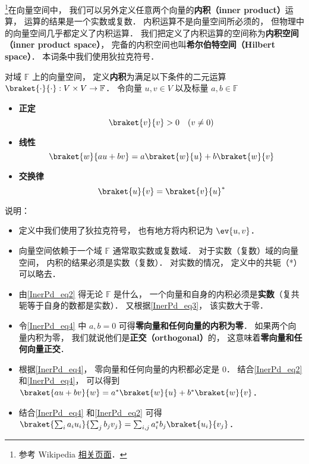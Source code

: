 

\footnote{参考 Wikipedia \href{https://en.wikipedia.org/wiki/Inner_product_space}{相关页面}．}在向量空间中， 我们可以另外定义任意两个向量的\textbf{内积（inner product）}运算， 运算的结果是一个实数或复数． 内积运算不是向量空间所必须的， 但物理中的向量空间几乎都定义了内积运算． 我们把定义了内积运算的空间称为\textbf{内积空间（inner product space）}， 完备的内积空间也叫\textbf{希尔伯特空间（Hilbert space）}． 本词条中我们使用狄拉克符号．

\begin{definition}{}
对域 $\mathbb F$ 上的向量空间， 定义\textbf{内积}为满足以下条件的二元运算 $\braket{\cdot}{\cdot}: V\times V\to \mathbb F$． 令向量 $u, v\in V$ 以及标量 $a, b \in \mathbb F$
\begin{itemize}
\item \textbf{正定}
\begin{equation}\label{InerPd_eq3}
\braket{v}{v} > 0 \quad (v \ne 0)
\end{equation}
\item \textbf{线性}
\begin{equation}\label{InerPd_eq4}
\braket{w}{a u + b v} = a\braket{w}{u} + b\braket{w}{v}
\end{equation}
\item \textbf{交换律}
\begin{equation}\label{InerPd_eq2}
\braket{u}{v} = \braket{v}{u}^*
\end{equation}
\end{itemize}
\end{definition}
说明：
\begin{itemize}
\item 定义中我们使用了狄拉克符号， 也有地方将内积记为 $\ev{u, v}$．
\item 向量空间依赖于一个域 $\mathbb F$ 通常取实数或复数域． 对于实数（复数）域的向量空间， 内积的结果必须是实数（复数）． 对实数的情况， 定义中的共轭（*）可以略去．
\item 由\autoref{InerPd_eq2}  得无论 $\mathbb F$ 是什么， 一个向量和自身的内积必须是\textbf{实数}（复共轭等于自身的数都是实数）． 又根据\autoref{InerPd_eq3}， 该实数大于零．
\item 令\autoref{InerPd_eq4} 中 $a,b= 0$ 可得\textbf{零向量和任何向量的内积为零}． 如果两个向量内积为零， 我们就说他们是\textbf{正交（orthogonal）}的， 这意味着\textbf{零向量和任何向量正交}．
\item 根据\autoref{InerPd_eq4}， 零向量和任何向量的内积都必定是 0． 结合\autoref{InerPd_eq2} 和\autoref{InerPd_eq4}， 可以得到 $\braket{a u + b v}{w} = a^*\braket{w}{u} + b^*\braket{w}{v}$．
\item 结合\autoref{InerPd_eq4} 和\autoref{InerPd_eq2} 可得 $\braket{\sum_i a_i u_i}{\sum_j b_j v_j} = \sum_{i,j} a_i^* b_j \braket{u_i}{v_j}$．
\end{itemize}

